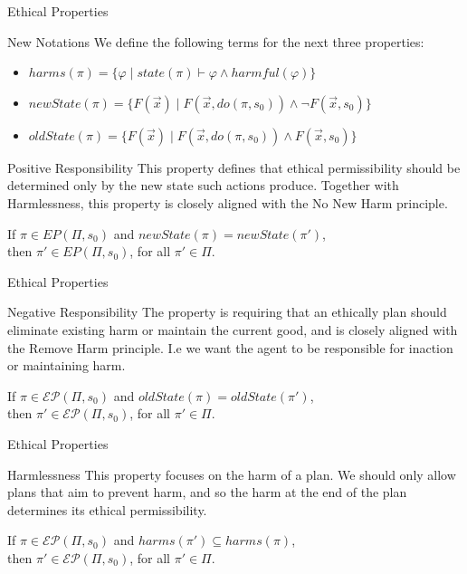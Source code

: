 \documentclass[compress,xcolor=table]{beamer}
\begin{document}
\begin{frame}{Ethical Properties}
    \begin{alertblock}{New Notations}
        We define the following terms for the next three properties:
        \begin{itemize}
            \item $harms(\pi) = \{ \varphi \mid state(\pi) \vdash \varphi \wedge harmful(\varphi) \}$ 
            \item $newState(\pi) = \{ F(\vec{x}) \mid F(\vec{x}, do(\pi, s_0)) \wedge \neg F(\vec{x}, s_0) \}$
            \item $oldState(\pi) = \{ F(\vec{x}) \mid F(\vec{x}, do(\pi, s_0)) \wedge F(\vec{x}, s_0) \}$
        \end{itemize}
    \end{alertblock}

    \begin{block}{Positive Responsibility}
        This property defines that ethical permissibility should be determined only by the 
        new state such actions produce. Together with Harmlessness, this property is closely aligned
        with the No New Harm principle.
    \end{block}

    If $\pi \in EP(\Pi, s_0)$ and $newState(\pi) = newState(\pi')$, \\
    then $\pi' \in EP(\Pi, s_0)$, for all $\pi' \in \Pi$.
    
\end{frame}

\begin{frame}{Ethical Properties}
    \begin{block}{Negative Responsibility}
    The property is requiring that an ethically plan should eliminate existing harm
    or maintain the current good, and is closely aligned with the Remove Harm principle. I.e we want the agent
    to be responsible for inaction or maintaining harm. 
    \end{block}
    If $\pi \in \mathcal{EP}(\Pi, s_0)$ and $oldState(\pi) = oldState(\pi')$, \\
    then $\pi' \in \mathcal{EP}(\Pi, s_0)$, for all $\pi' \in \Pi$.
\end{frame}

\begin{frame}{Ethical Properties}
    \begin{block}{Harmlessness}
        This property focuses on the harm of a plan. We should only allow plans that aim to prevent harm,
        and so the harm at the end of the plan determines its ethical permissibility.
    \end{block}
   If $\pi \in \mathcal{EP}(\Pi, s_0)$ and $harms(\pi') \subseteq harms(\pi)$, \\
   then $\pi' \in \mathcal{EP}(\Pi, s_0)$, for all $\pi' \in \Pi$.
\end{frame}
\end{document}
